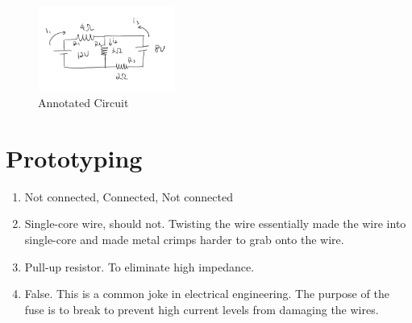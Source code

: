 \documentclass{article}
\begin{document}
	\begin{figure}[!h]
		\center
		\includegraphics[width=0.4\textwidth, keepaspectratio]{crappyhand}
		\caption{Annotated Circuit}
		\label{fig:kirchoff_hand}
	\end{figure}

\section{Prototyping}
\begin{enumerate}
	\item Not connected, Connected, Not connected
	\item Single-core wire, should not. Twisting the wire essentially made the wire into single-core and made metal crimps harder to grab onto the wire.
	\item Pull-up resistor. To eliminate high impedance.
	\item False. This is a common joke in electrical engineering. The purpose of the fuse is to break to prevent high current levels from damaging the wires.
\end{enumerate}
\end{document}
